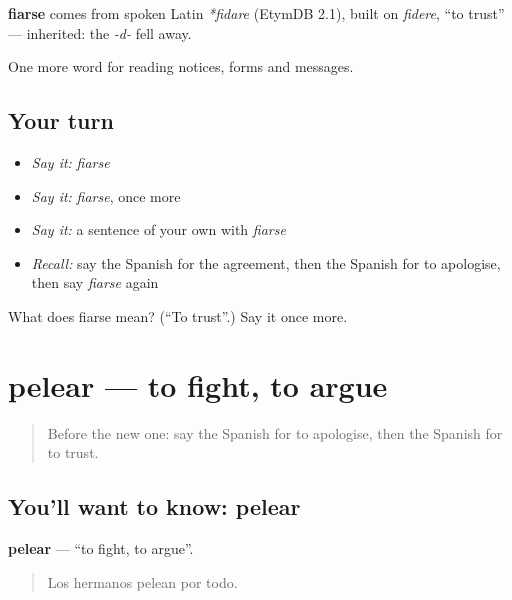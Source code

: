 \begin{cousinweb}
\textbf{fiarse} comes from spoken Latin \emph{*fidare} (EtymDB 2.1), built on \emph{fidere}, \textquotedblleft{}to trust\textquotedblright{} — inherited: the \emph{-d-} fell away.
\end{cousinweb}

\begin{grammarlens}[title={What you've built}]
One more word for reading notices, forms and messages.
\end{grammarlens}

\subsection*{Your turn}
\begin{itemize}
\raggedright
  \item \emph{Say it:} \emph{fiarse}
  \item \emph{Say it:} \emph{fiarse}, once more
  \item \emph{Say it:} a sentence of your own with \emph{fiarse}
  \item \emph{Recall:} say the Spanish for the agreement, then the Spanish for to apologise, then say \emph{fiarse} again
\end{itemize}

\begin{tcolorbox}[breakable,colback=teal!4,colframe=teal!35!black,title={Before you move on}]
What does fiarse mean? (\textquotedblleft{}To trust\textquotedblright{}.) Say it once more.
\end{tcolorbox}
\section[pelear]{pelear — to fight, to argue}

\label{lesson:ES-C510-pelear}



\begin{quote}
Before the new one: say the Spanish for to apologise, then the Spanish for to trust.
\end{quote}

\subsection*{You'll want to know: pelear}
\textbf{pelear} — \textquotedblleft{}to fight, to argue\textquotedblright{}.

\begin{quote}
Los hermanos pelean por todo.
\end{quote}

